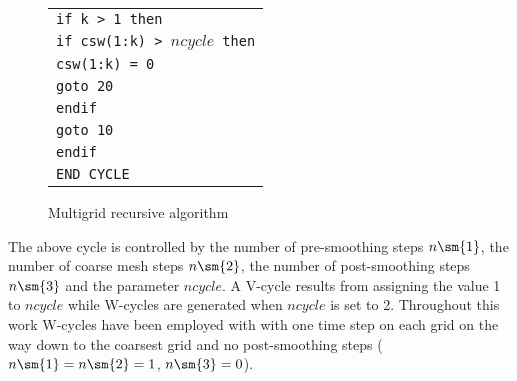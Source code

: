 \begin{figure}[h]
{{\begin{tabular}{l}
\hspace{10mm}  \tt if k > 1 then\\
\hspace{15mm}  \tt if csw(1:k) > $ncycle$ then\\
\hspace{20mm}  \tt csw(1:k) = 0\\
\hspace{20mm}  \tt goto 20\\
\hspace{15mm}  \tt endif\\
\hspace{15mm}  \tt goto 10\\
\hspace{10mm}  \tt endif\\
\tt END CYCLE
\end{tabular}}}
\caption{Multigrid recursive algorithm}
\label{multigrid.scheme.fig}
\end{figure}
%
 The above cycle is controlled by the number of pre-smoothing steps
 $n\sm{1}$, the number of coarse mesh steps $n\sm{2}$, the number
 of post-smoothing steps $n\sm{3}$ and the parameter $ncycle$.
 A V-cycle results from assigning the value 1 to $ncycle$ while
 W-cycles are generated when $ncycle$ is set to 2.
 Throughout this work W-cycles have been employed with
 with one time step on each grid on the way down to the coarsest grid
 and no post-smoothing steps ($n\sm{1} = n\sm{2} = 1$, $n\sm{3} = 0$).
